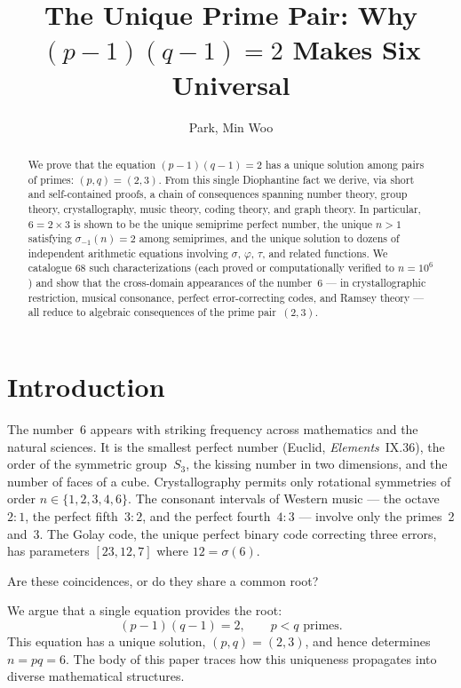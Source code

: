\documentclass{amsart}
\title{The Unique Prime Pair: Why $(p{-}1)(q{-}1)=2$ Makes Six Universal}
\author{Park, Min Woo}
\begin{document}
\begin{abstract}
We prove that the equation $(p-1)(q-1)=2$ has a unique solution among pairs of primes: $(p,q) = (2,3)$. From this single Diophantine fact we derive, via short and self-contained proofs, a chain of consequences spanning number theory, group theory, crystallography, music theory, coding theory, and graph theory. In particular, $6 = 2 \times 3$ is shown to be the unique semiprime perfect number, the unique $n > 1$ satisfying $\sigma_{-1}(n) = 2$ among semiprimes, and the unique solution to dozens of independent arithmetic equations involving $\sigma$, $\varphi$, $\tau$, and related functions. We catalogue 68 such characterizations (each proved or computationally verified to $n = 10^6$) and show that the cross-domain appearances of the number~6 --- in crystallographic restriction, musical consonance, perfect error-correcting codes, and Ramsey theory --- all reduce to algebraic consequences of the prime pair~$(2,3)$.
\end{abstract}

\maketitle

\section{Introduction}

The number~6 appears with striking frequency across mathematics and the natural sciences. It is the smallest perfect number (Euclid, \emph{Elements}~IX.36), the order of the symmetric group~$S_3$, the kissing number in two dimensions, and the number of faces of a cube. Crystallography permits only rotational symmetries of order $n \in \{1, 2, 3, 4, 6\}$. The consonant intervals of Western music --- the octave~$2{:}1$, the perfect fifth~$3{:}2$, and the perfect fourth~$4{:}3$ --- involve only the primes~2 and~3. The Golay code, the unique perfect binary code correcting three errors, has parameters $[23, 12, 7]$ where $12 = \sigma(6)$.

Are these coincidences, or do they share a common root?

We argue that a single equation provides the root:
\[
(p - 1)(q - 1) = 2, \qquad p < q \text{ primes.}
\]
This equation has a unique solution, $(p, q) = (2, 3)$, and hence determines $n = pq = 6$. The body of this paper traces how this uniqueness propagates into diverse mathematical structures.
\end{document}
